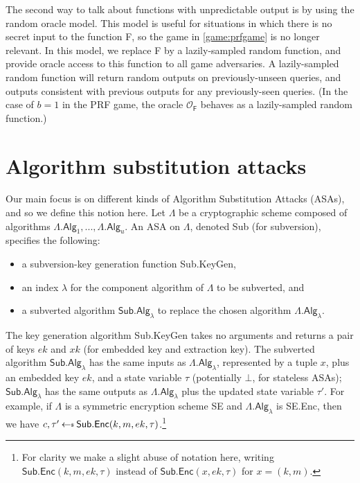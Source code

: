 The second way to talk about functions with unpredictable output is by using the random oracle model. This model is useful for situations in which there is no secret input to the function \textsf{F}, so the game in \autoref{game:prfgame} is no longer relevant. In this model, we replace \textsf{F} by a lazily-sampled random function, and provide oracle access to this function to all game adversaries. A lazily-sampled random function will return random outputs on previously-unseen queries, and outputs consistent with previous outputs for any previously-seen queries. (In the case of $b=1$ in the PRF game, the oracle $\mathcal{O}_\mathsf{F}$ behaves as a lazily-sampled random function.)

\section{Algorithm substitution attacks}

Our main focus is on different kinds of Algorithm Substitution Attacks (ASAs), and so we define this notion here. Let $\mathsf{\Lambda}$ be a cryptographic scheme composed of algorithms $\mathsf{\Lambda.Alg}_1,..., \mathsf{\Lambda.Alg}_u$. An ASA on $\mathsf{\Lambda}$, denoted \textsf{Sub} (for subversion), specifies the following:
\begin{itemize}
\item a subversion-key generation function \textsf{Sub.KeyGen},
\item an index $\lambda$ for the component algorithm of $\mathsf{\Lambda}$ to be subverted, and
\item a subverted algorithm $\mathsf{Sub.Alg}_\lambda$ to replace the chosen algorithm $\mathsf{\Lambda.Alg}_\lambda$.
\end{itemize}

The key generation algorithm \textsf{Sub.KeyGen} takes no arguments and returns a pair of keys $ek$ and $xk$ (for embedded key and extraction key). The subverted algorithm $\mathsf{Sub.Alg}_\lambda$ has the same inputs as $\mathsf{\Lambda.Alg}_\lambda$, represented by a tuple $x$, plus an embedded key $ek$, and a state variable $\tau$ (potentially $\bot$, for stateless ASAs); $\mathsf{Sub.Alg}_\lambda$ has the same outputs as $\mathsf{\Lambda.Alg}_\lambda$ plus the updated state variable $\tau'$. For example, if $\mathsf{\Lambda}$ is a symmetric encryption scheme \textsf{SE} and $\mathsf{\Lambda.Alg}_\lambda$ is \textsf{SE.Enc}, then we have $c, \tau' \sample \mathsf{Sub.Enc}(k, m, ek, \tau)$.\footnote{For clarity we make a slight abuse of notation here, writing $\mathsf{Sub.Enc}(k, m, ek, \tau)$ instead of $\mathsf{Sub.Enc}(x, ek, \tau)$ for $x=(k, m)$.}

